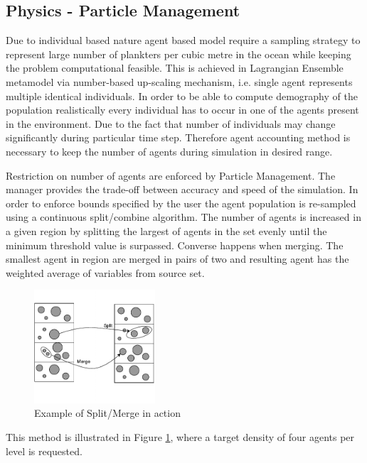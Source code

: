 \documentclass[12pt, a4paper]{report}
\begin{document}
\subsection{Physics - Particle Management}\label{subsec:physics}
Due to individual based nature agent based model require a sampling
strategy to represent large number of plankters per cubic metre in the
ocean while keeping the problem computational feasible. This is achieved
in Lagrangian Ensemble metamodel via number-based up-scaling mechanism,
i.e. single agent represents multiple identical individuals. In order
to be able to compute demography of the population realistically
every individual has to occur in one of the agents present in the
environment. Due to the fact that number of individuals may change
significantly during particular time step. Therefore agent accounting
method is necessary to keep the number of agents during simulation
in desired range.

Restriction on number of agents are enforced by Particle Management.
The manager provides the trade-off between accuracy and speed of the
simulation. In order to enforce bounds specified by the user
the agent population is re-sampled using a continuous split/combine
algorithm. The number of agents is increased in a given region
by splitting the largest of agents in the set evenly until
the minimum threshold value is surpassed. Converse happens when
merging. The smallest agent in region are merged in pairs of two
and resulting agent has the weighted average of variables from source
set.

\begin{figure}[H]
  \begin{center}
    \includegraphics[width=0.4\textwidth,natwidth=366,natheight=342]{images/Split_merge.pdf}
    \caption{Example of Split/Merge in action}
    \label{fig:split-merge}
  \end{center}
\end{figure}

This method is illustrated in Figure \ref{fig:split-merge},
where a target density of four agents per level is requested.
\end{document}
